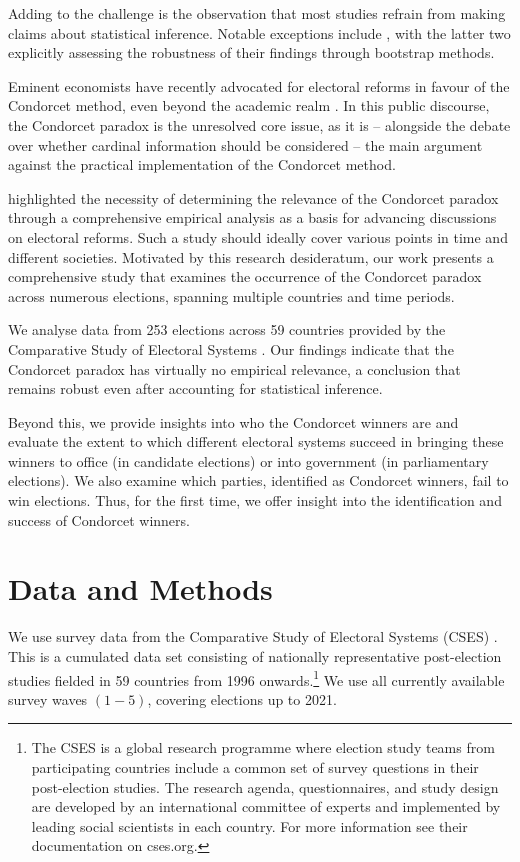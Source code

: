\documentclass[12pt]{scrartcl}
\newcommand{\nbelections}{253 }
\newcommand{\nbcountries}{59 }
\begin{document}
Adding to the challenge is the observation that most studies refrain from making claims about statistical inference. Notable exceptions include \cite{Potthoff2021, Desai2025, Regenwetter2007, Darmann2019}, with the latter two explicitly assessing the robustness of their findings through bootstrap methods.

Eminent economists have recently advocated for electoral reforms in favour of the Condorcet method, even beyond the academic realm \citep{Maskin2016, Maskin2017, Maskin2017a}. In this public discourse, the Condorcet paradox is the unresolved core issue, as it is -- alongside the debate over whether cardinal information should be considered -- the main argument against the practical implementation of the Condorcet method.

\citet[Ch.~10.2]{Sen2017} highlighted the necessity of determining the relevance of the Condorcet paradox through a comprehensive empirical analysis as a basis for advancing discussions on electoral reforms. Such a study should ideally cover various points in time and different societies. Motivated by this research desideratum, our work presents a comprehensive study that examines the occurrence of the Condorcet paradox across numerous elections, spanning multiple countries and time periods. 

We analyse data from \nbelections elections across \nbcountries countries provided by the Comparative Study of Electoral Systems \citep{CSES2020}. Our findings indicate that the Condorcet paradox has virtually no empirical relevance, a conclusion that remains robust even after accounting for statistical inference. 

Beyond this, we provide insights into who the Condorcet winners are and evaluate the extent to which different electoral systems succeed in bringing these winners to office (in candidate elections) or into government (in parliamentary elections). We also examine which parties, identified as Condorcet winners, fail to win elections. Thus, for the first time, we offer insight into the identification and success of Condorcet winners.

\section{Data and Methods}\label{sec.datamethods}  
We use survey data from the Comparative Study of Electoral Systems (CSES) \citep{CSES2020}. This is a cumulated data set consisting of nationally representative post-election studies fielded in 59 countries from 1996 onwards.\footnote{
    The CSES is a global research programme where election study teams from participating countries include a common set of survey questions in their post-election studies. The research agenda, questionnaires, and study design are developed by an international committee of experts and implemented by leading social scientists in each country. For more information see their documentation on cses.org.
} We use all currently available survey waves $(1-5)$, covering elections up to 2021.
\end{document}
